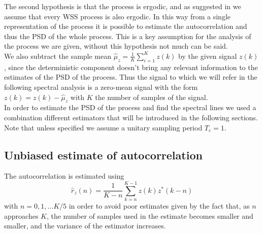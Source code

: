 \documentclass[10pt]{article}
\numberwithin{equation}{section}
\begin{document}
The second hypothesis is that the process is ergodic, and as suggested in \cite{bc} we assume that every WSS process is also ergodic. In this way from a single representation of the process it is possible to estimate the autocorrelation and thus the PSD of the whole process. This is a key assumption for the analysis of the process we are given, without this hypothesis not much can be said. \\
We also subtract the sample mean $\hat{\mu}_z = \frac{1}{K} \sum_{i=1}^K z(k)$ by the given signal $z(k)$, since the deterministic component doesn't bring any relevant information to the estimates of the PSD of the process. Thus the signal to which we will refer in the following spectral analysis is a zero-mean signal with the form $z(k) = z(k) - \hat{\mu}_z$ with $K$ the number of samples of the signal. \\
In order to estimate the PSD of the process and find the spectral lines we used a combination different estimators that will be introduced in the following sections. \\
Note that unless specified we assume a unitary sampling period $T_c = 1$.

\subsection{Unbiased estimate of autocorrelation}
\label{sec:unbauto}
The autocorrelation is estimated using
\begin{equation}
  \hat{r}_z(n) = \frac{1}{K - n}\sum_{k=n}^{K-1} z(k) z^*(k-n)
  \label{eq:auto}
\end{equation}
with $n = 0, 1, ... K/5$ in order to avoid poor estimates given by the fact that, as $n$ approaches $K$, the number of samples used in the estimate becomes smaller and smaller, and the variance of the estimator increases.
\end{document}
